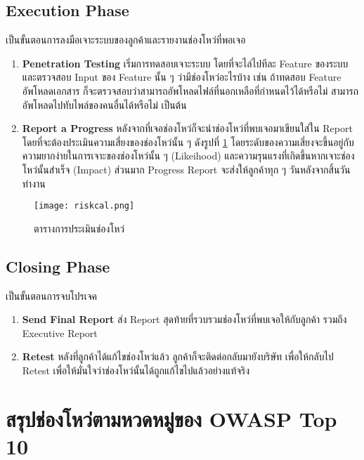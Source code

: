 \subsection{Execution Phase}

เป็นขั้นตอนการลงมือเจาะระบบของลูกค้าและรายงานช่องโหว่ที่พอเจอ

\begin{enumerate}
	\itemsep0em 
	\item \textbf{Penetration Testing} เริ่มการทดสอบเจาะระบบ โดยที่จะไล่ไปทีละ Feature ของระบบ และตรวจสอบ Input ของ Feature นั้น ๆ ว่ามีช่องโหว่อะไรบ้าง เช่น ถ้าทดสอบ Feature อัพโหลดเอกสาร ก็จะตรวจสอบว่าสามารถอัพโหลดไฟล์ที่นอกเหลือที่กำหนดไว้ได้หรือไม่  สามารถอัพโหลดไปทับไพล์ของคนอื่นได้หรือไม่ เป็นต้น
	\item \textbf{Report a Progress} หลังจากที่เจอช่องโหว่ก็จะนำช่องโหว่ที่พบเจอมาเขียนใส่ใน Report โดยที่จะต้องประเมินความเสี่ยงของช่องโหว่นั้น ๆ ดังรูปที่ \ref{Fig:riskcal} โดยระดับของความเสี่ยงจะขึ้นอยู่กับความยากง่ายในการเจาะของช่องโหว่นั้น ๆ (Likeihood) และความรุนแรงที่เกิดขึ้นหากเจาะช่องโหว่นั้นสำเร็จ (Impact) ส่วนมาก Progress Report จะส่งให้ลูกค้าทุก ๆ  วันหลังจากสิ้นวันทำงาน
	
\end{enumerate}

\begin{figure}[h]
	\centering
	\texttt{[image: riskcal.png]}
	\caption{ตารางการประเมินช่องโหว่}
	\label{Fig:riskcal}
\end{figure}

\subsection{Closing Phase}

เป็นขั้นตอนการจบโปรเจค

\begin{enumerate}
	\itemsep0em 
	\item \textbf{Send Final Report} ส่ง Report สุดท้ายที่รวบรวมช่องโหว่ที่พบเจอให้กับลูกค้า รวมถึง Executive Report
	\item \textbf{Retest} หลังที่ลูกค้าได้แก้ไขช่องโหว่แล้ว ลูกค้าก็จะติดต่อกลับมายังบริษัท เพื่อให้กลับไป Retest เพื่อให้มั่นใจว่าช่องโหว่นั้นได้ถูกแก้ไขไปแล้วอย่างแท้จริง
\end{enumerate}

\section{สรุปช่องโหว่ตามหวดหมู่ของ OWASP Top 10}

